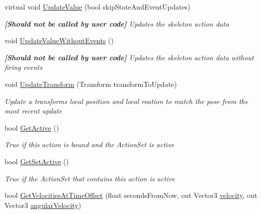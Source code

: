 \begin{DoxyCompactItemize}
\item 
virtual void \mbox{\hyperlink{class_valve_1_1_v_r_1_1_steam_v_r___action___skeleton_ad4db27ce0ec44f65857ad24367fb1a27}{Update\+Value}} (bool skip\+State\+And\+Event\+Updates)
\begin{DoxyCompactList}\small\item\em {\bfseries{\mbox{[}Should not be called by user code\mbox{]}}} Updates the skeleton action data \end{DoxyCompactList}\item 
void \mbox{\hyperlink{class_valve_1_1_v_r_1_1_steam_v_r___action___skeleton_af2a0c3bcaea3b4bc17cbf8f3a0d4794f}{Update\+Value\+Without\+Events}} ()
\begin{DoxyCompactList}\small\item\em {\bfseries{\mbox{[}Should not be called by user code\mbox{]}}} Updates the skeleton action data without firing events \end{DoxyCompactList}\item 
void \mbox{\hyperlink{class_valve_1_1_v_r_1_1_steam_v_r___action___skeleton_abe07333258dac738794a0be1b5b8683b}{Update\+Transform}} (Transform transform\+To\+Update)
\begin{DoxyCompactList}\small\item\em Update a transform\textquotesingle{}s local position and local roation to match the pose from the most recent update \end{DoxyCompactList}\item 
bool \mbox{\hyperlink{class_valve_1_1_v_r_1_1_steam_v_r___action___skeleton_a8d5cfd8a2361cdc5b268eddbacd05230}{Get\+Active}} ()
\begin{DoxyCompactList}\small\item\em True if this action is bound and the Action\+Set is active \end{DoxyCompactList}\item 
bool \mbox{\hyperlink{class_valve_1_1_v_r_1_1_steam_v_r___action___skeleton_ad21ee279c89b6e30eb8f8de7c5c2c450}{Get\+Set\+Active}} ()
\begin{DoxyCompactList}\small\item\em True if the Action\+Set that contains this action is active \end{DoxyCompactList}\item 
bool \mbox{\hyperlink{class_valve_1_1_v_r_1_1_steam_v_r___action___skeleton_a4b4b4dbafdecf7d2d25ecd4db9b4e1b3}{Get\+Velocities\+At\+Time\+Offset}} (float seconds\+From\+Now, out Vector3 \mbox{\hyperlink{class_valve_1_1_v_r_1_1_steam_v_r___action___pose___base_aaf2089c742c29110276191454cda9c7a}{velocity}}, out Vector3 \mbox{\hyperlink{class_valve_1_1_v_r_1_1_steam_v_r___action___pose___base_a84bf81feaa02463f8151e1ea25e16825}{angular\+Velocity}})

\end{DoxyCompactItemize}
